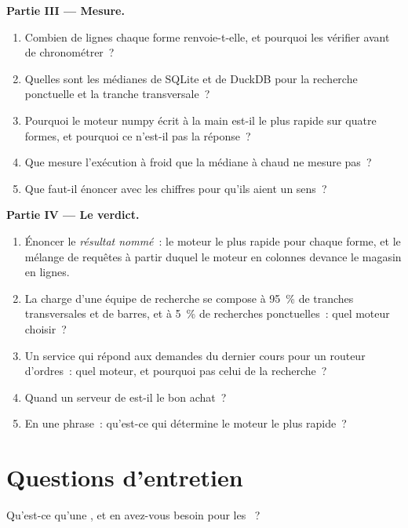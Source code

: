 \begin{problem}
\medskip\noindent\textbf{Partie III --- Mesure.}
\begin{enumerate}[resume]
\item Combien de lignes chaque forme renvoie-t-elle, et pourquoi les vérifier avant de chronométrer~?
\item Quelles sont les médianes de SQLite et de DuckDB pour la recherche ponctuelle et la tranche transversale~?
\item Pourquoi le moteur numpy écrit à la main est-il le plus rapide sur quatre formes, et pourquoi ce n'est-il pas la réponse~?
\item Que mesure l'exécution à froid que la médiane à chaud ne mesure pas~?
\item Que faut-il énoncer avec les chiffres pour qu'ils aient un sens~?
\end{enumerate}

\medskip\noindent\textbf{Partie IV --- Le verdict.}
\begin{enumerate}[resume]
\item Énoncer le \emph{résultat nommé}~: le moteur le plus rapide pour chaque forme, et le mélange de requêtes à partir duquel le moteur en colonnes devance
le magasin en lignes.
\item La charge d'une équipe de recherche se compose à 95~\% de tranches transversales et de barres, et à 5~\% de recherches ponctuelles~: quel moteur choisir~?
\item Un service qui répond aux demandes du dernier cours pour un routeur d'ordres~: quel moteur, et pourquoi pas celui de la recherche~?
\item Quand un serveur de  est-il le bon achat~?
\item En une phrase~: qu'est-ce qui détermine le moteur le plus rapide~?
\end{enumerate}
\end{problem}

\section{Questions d'entretien}

\begin{interviewq}\label{iq:pl:time-series-databases-and-the-alternatives:1}
Qu'est-ce qu'une , et en avez-vous besoin pour les ~?
\end{interviewq}

